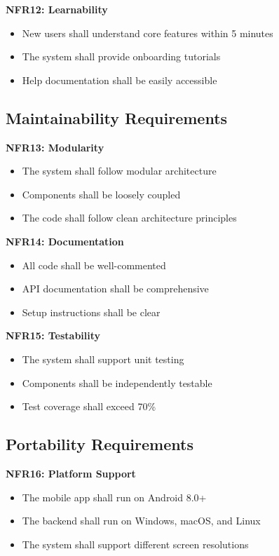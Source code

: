 \documentclass[11pt,a4paper]{report}
\begin{document}
\textbf{NFR12: Learnability}
\begin{itemize}
    \item New users shall understand core features within 5 minutes
    \item The system shall provide onboarding tutorials
    \item Help documentation shall be easily accessible
\end{itemize}

\subsection{Maintainability Requirements}

\textbf{NFR13: Modularity}
\begin{itemize}
    \item The system shall follow modular architecture
    \item Components shall be loosely coupled
    \item The code shall follow clean architecture principles
\end{itemize}

\textbf{NFR14: Documentation}
\begin{itemize}
    \item All code shall be well-commented
    \item API documentation shall be comprehensive
    \item Setup instructions shall be clear
\end{itemize}

\textbf{NFR15: Testability}
\begin{itemize}
    \item The system shall support unit testing
    \item Components shall be independently testable
    \item Test coverage shall exceed 70\%
\end{itemize}

\subsection{Portability Requirements}

\textbf{NFR16: Platform Support}
\begin{itemize}
    \item The mobile app shall run on Android 8.0+
    \item The backend shall run on Windows, macOS, and Linux
    \item The system shall support different screen resolutions
\end{itemize}
\end{document}
